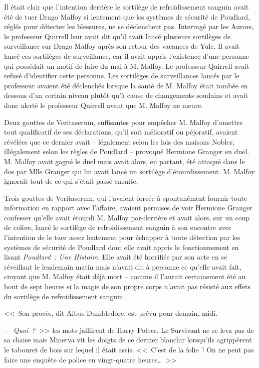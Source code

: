 Il était clair que l'intention derrière le sortilège de refroidissement sanguin avait été de tuer Drago Malfoy si lentement que les systèmes de sécurité de Poudlard, réglés pour détecter les blessures, ne se déclenchent pas. Interrogé par les Aurors, le professeur Quirrell leur avait dit qu'il avait lancé plusieurs sortilèges de surveillance sur Drago Malfoy après son retour des vacances de Yule. Il avait lancé ces sortilèges de surveillance, car il avait appris l'existence d'une personne qui possédait un motif de faire du mal à M. Malfoy. Le professeur Quirrell avait refusé d'identifier cette personne. Les sortilèges de surveillances lancés par le professeur avaient été déclenchés lorsque la santé de M. Malfoy était tombée en dessous d'un certain niveau plutôt qu'à cause de changements soudains et avait donc alerté le professeur Quirrell avant que M. Malfoy ne meure.

Deux gouttes de Veritaserum, suffisantes pour empêcher M. Malfoy d'omettre tout qualificatif de ses déclarations, qu'il soit mélioratif ou péjoratif, avaient révélées que ce dernier avait -- légalement selon les lois des maisons Nobles, illégalement selon les règles de Poudlard -- provoqué Hermione Granger en duel. M. Malfoy avait gagné le duel mais avait alors, en partant, été attaqué dans le dos par Mlle Granger qui lui avait lancé un sortilège d'étourdissement. M. Malfoy ignorait tout de ce qui s'était passé ensuite.

Trois gouttes de Veritaserum, qui l'avaient forcée à spontanément fournir toute information en rapport avec l'affaire, avaient permises de voir Hermione Granger confesser qu'elle avait étourdi M. Malfoy par-derrière et avait alors, sur un coup de colère, lancé le sortilège de refroidissement sanguin à son encontre avec l'intention de le tuer assez lentement pour échapper à toute détection par les systèmes de sécurité de Poudlard dont elle avait appris le fonctionnement en lisant \emph{Poudlard~: Une Histoire}. Elle avait été horrifiée par son acte en se réveillant le lendemain matin mais n'avait dit à personne ce qu'elle avait fait, croyant que M. Malfoy était déjà mort -- comme il l'aurait certainement été au bout de sept heures si la magie de son propre corps n'avait pas résisté aux effets du sortilège de refroidissement sanguin.

<<~Son procès, dit Albus Dumbledore, est prévu pour demain, midi.

--- \emph{Quoi~?}~>> les mots jaillirent de Harry Potter. Le Survivant ne se leva pas de sa chaise mais Minerva vit les doigts de ce dernier blanchir lorsqu'ils agrippèrent le tabouret de bois sur lequel il était assis. <<~C'est de la folie~! On ne peut pas faire une enquête de police en vingt-quatre heures…~>>


